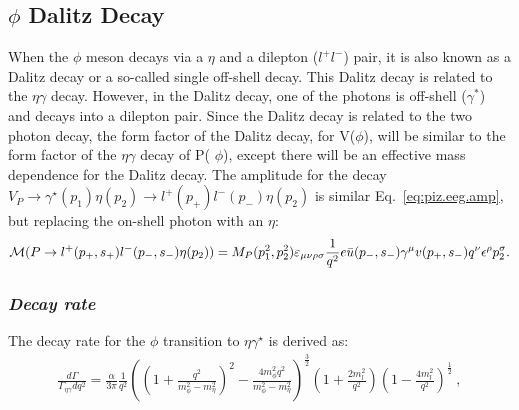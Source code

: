 \subsection{$\phi$ Dalitz Decay}\label{sec:phidalitzdecay} 
When the $\phi$ meson decays via a $\eta$ and a dilepton ($l^{+}l^{-}$) pair, it is also known as a Dalitz decay or a so-called single off-shell decay. This Dalitz decay is related to the $\eta \gamma$ decay. However, in the Dalitz decay, one of the photons is off-shell ($\gamma^*$) and decays into a dilepton pair. Since the Dalitz decay is related to the two photon decay, the form factor of the Dalitz decay, for V($\phi$), will be similar to the form factor of the $\eta \gamma$ decay of P( $\phi$), except there will be an effective mass dependence for the Dalitz decay. 
The amplitude for the decay $V_P \to \gamma^\star(p_1) \eta(p_2) \to l^+(p_+)l^-(p_-) \eta(p_2)$ is similar Eq.~\ref{eq:piz.eeg.amp}, but replacing the on-shell photon with an $\eta$:
\begin{equation}\label{eq:phi.eeg.amp}
{\cal M}(P\to l^+(p_+,s_+)l^-(p_-,s_-) \eta(p_2)) = {M}_P(p_{1}^2,p_{2}^2) \varepsilon_{\mu\nu\rho\sigma} \frac{1}{q^2} e \bar u(p_-,s_-) \gamma^\mu v(p_+,s_-) q^\nu \epsilon^\rho p_{2}^\sigma.
\end{equation}
\subsubsection{\emph{Decay rate}}
The decay rate for the $\phi$ transition to $\eta \gamma^\star$ is derived as:
\begin{align}
\frac{d\Gamma}{\Gamma_{\eta\gamma} dq^2} = \frac{\alpha}{3 \pi} \frac{1}{q^2} \left( \left(1+ \frac{q^2}{m_{\phi}^2 - m_{\eta}^2} \right)^2 - \frac{4 m_{\phi}^2 q^2}{m_{\phi}^2 - m_{\eta}^2}\right)^\frac{3}{2} \left( 1+ \frac{2m_l^2}{q^2}\right) \left( 1- \frac{4m_l^2}{q^2}\right)^{\frac{1}{2}} \ ,
\end{align}


